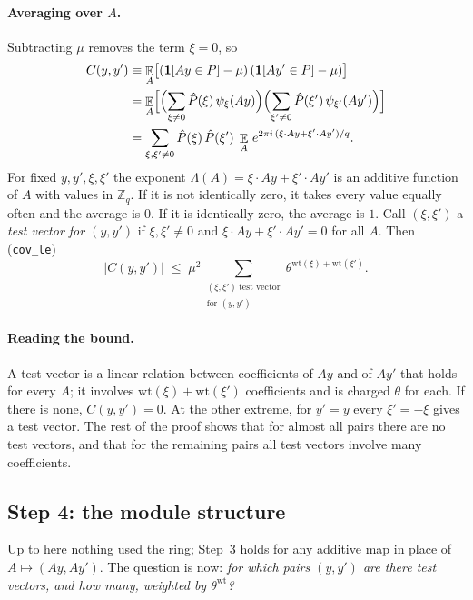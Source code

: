 \documentclass[11pt]{article}
\theoremstyle{definition}
\theoremstyle{remark}
\newcommand{\Zq}{\mathbb{Z}_q}
\newcommand{\E}{\mathop{\mathbb{E}}}
\newcommand{\lean}[1]{\texttt{#1}}
\begin{document}
\paragraph{Averaging over $A$.}
Subtracting $\mu$ removes the term $\xi = 0$, so
\begin{align*}
  C(y,y') &\equiv \E_A\bigl[(\mathbf 1[Ay\in P]-\mu)\,(\mathbf 1[Ay'\in P]-\mu)\bigr]\\
          &= \E_A\Bigl[\Bigl(\sum_{\xi\ne0}\hat P(\xi)\,\psi_\xi(Ay)\Bigr)
                       \Bigl(\sum_{\xi'\ne0}\hat P(\xi')\,\psi_{\xi'}(Ay')\Bigr)\Bigr]\\
          &= \sum_{\xi,\xi'\ne0}\hat P(\xi)\,\hat P(\xi')\;
             \E_A\, e^{2\pi i\,(\xi\cdot Ay+\xi'\cdot Ay')/q}.
\end{align*}
For fixed $y,y',\xi,\xi'$ the exponent $\Lambda(A) = \xi\cdot Ay+\xi'\cdot Ay'$ is an additive
function of $A$ with values in $\Zq$. If it is not identically zero, it takes every value equally
often and the average is $0$. If it is identically zero, the average is $1$. Call $(\xi,\xi')$ a
\emph{test vector for $(y,y')$} if $\xi,\xi'\ne0$ and $\xi\cdot Ay+\xi'\cdot Ay' = 0$ for all
$A$. Then (\lean{cov\_le})
\[
  |C(y,y')| \;\le\; \mu^2\!\!\sum_{\substack{(\xi,\xi')\ \text{test vector}\\\text{for }(y,y')}}\!\!
    \theta^{\mathrm{wt}(\xi)+\mathrm{wt}(\xi')} .
\]

\paragraph{Reading the bound.}
A test vector is a linear relation between coefficients of $Ay$ and of $Ay'$ that holds for every
$A$; it involves $\mathrm{wt}(\xi)+\mathrm{wt}(\xi')$ coefficients and is charged $\theta$ for each.
If there is none, $C(y,y') = 0$. At the other extreme, for $y'=y$ every $\xi' = -\xi$ gives a test
vector. The rest of the proof shows that for almost all pairs there are no test vectors, and
that for the remaining pairs all test vectors involve many coefficients.

\subsection{Step 4: the module structure}

Up to here nothing used the ring; Step~3 holds for any additive map in place of
$A\mapsto(Ay,Ay')$. The question is now: \emph{for which pairs $(y,y')$ are there test vectors,
and how many, weighted by $\theta^{\mathrm{wt}}$?}
\end{document}
